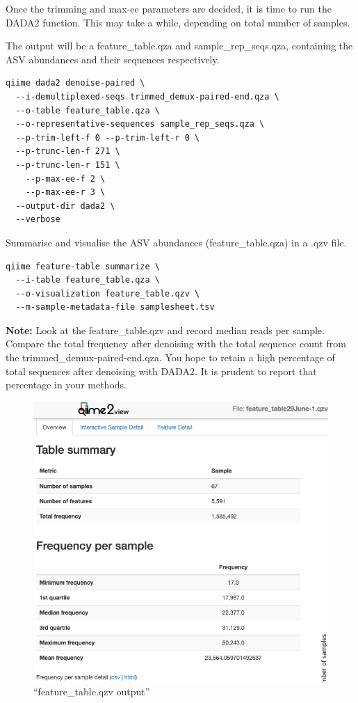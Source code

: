 \documentclass[
]{book}
\begin{document}
Once the trimming and max-ee parameters are decided, it is time to run the DADA2 function. This may take a while, depending on total number of samples.

The output will be a feature\_table.qza and sample\_rep\_seqs.qza, containing the ASV abundances and their sequences respectively.

\begin{verbatim}
qiime dada2 denoise-paired \
  --i-demultiplexed-seqs trimmed_demux-paired-end.qza \
  --o-table feature_table.qza \
  --o-representative-sequences sample_rep_seqs.qza \
  --p-trim-left-f 0 --p-trim-left-r 0 \
  --p-trunc-len-f 271 \
  --p-trunc-len-r 151 \
    --p-max-ee-f 2 \
    --p-max-ee-r 3 \
  --output-dir dada2 \
  --verbose
\end{verbatim}

Summarise and visualise the ASV abundances (feature\_table.qza) in a .qzv file.

\begin{verbatim}
qiime feature-table summarize \
  --i-table feature_table.qza \
  --o-visualization feature_table.qzv \
  --m-sample-metadata-file samplesheet.tsv
\end{verbatim}

\textbf{Note:} Look at the feature\_table.qzv and record median reads per sample. Compare the total frequency after denoising with the total sequence count from the trimmed\_demux-paired-end.qza. You hope to retain a high percentage of total sequences after denoising with DADA2. It is prudent to report that percentage in your methods.

\begin{figure}
\centering
\includegraphics{./img/feature-table.qzv.png}
\caption{``feature\_table.qzv output''}
\end{figure}
\end{document}
